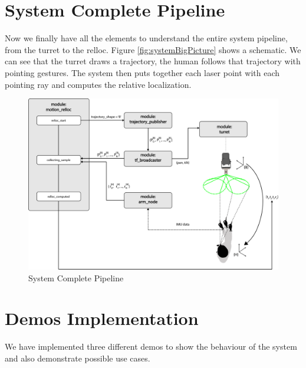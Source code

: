 \section{System Complete Pipeline}
Now we finally have all the elements to understand the entire system pipeline, from the turret to the relloc. Figure \ref{fig:systemBigPicture} shows a schematic. We can see that the turret draws a trajectory, the human follows that trajectory with pointing gestures. The system then puts together each laser point with each pointing ray and computes the relative localization.
\begin{figure}
	\centering
	\includegraphics[width=\textwidth]{img/systemPipeline.png}%
	\caption{System Complete Pipeline}
	\label{fig:turretPipeline}
\end{figure}

\section{Demos Implementation}
We have implemented three different demos to show the behaviour of the system and also demonstrate possible use cases.
